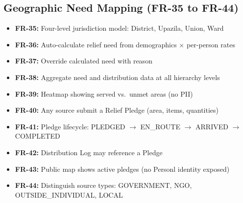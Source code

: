 \subsection{Geographic Need Mapping (FR-35 to FR-44)}
\begin{itemize}[nosep]
    \item \textbf{FR-35:} Four-level jurisdiction model: District, Upazila, Union, Ward
    \item \textbf{FR-36:} Auto-calculate relief need from demographics $\times$ per-person rates
    \item \textbf{FR-37:} Override calculated need with reason
    \item \textbf{FR-38:} Aggregate need and distribution data at all hierarchy levels
    \item \textbf{FR-39:} Heatmap showing served vs.\ unmet areas (no PII)
    \item \textbf{FR-40:} Any source submit a Relief Pledge (area, items, quantities)
    \item \textbf{FR-41:} Pledge lifecycle: PLEDGED $\rightarrow$ EN\_ROUTE $\rightarrow$ ARRIVED $\rightarrow$ COMPLETED
    \item \textbf{FR-42:} Distribution Log may reference a Pledge
    \item \textbf{FR-43:} Public map shows active pledges (no Personl identity exposed)
    \item \textbf{FR-44:} Distinguish source types: GOVERNMENT, NGO, OUTSIDE\_INDIVIDUAL, LOCAL
\end{itemize}


